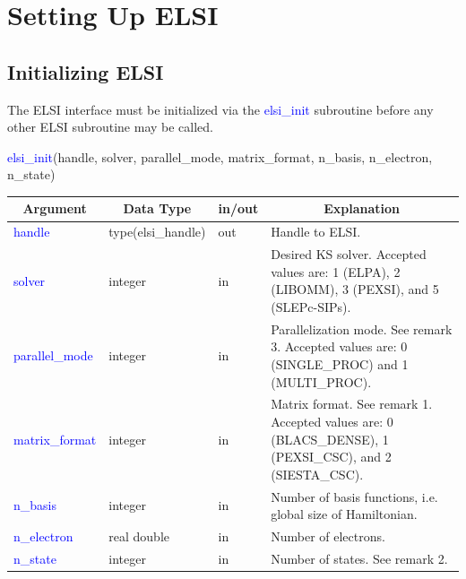 \documentclass{report}
\begin{document}
\section{Setting Up ELSI}
\label{sec:setup}
\subsection{Initializing ELSI}
\label{subsec:setup_init}
The ELSI interface must be initialized via the \textcolor{blue}{elsi\_init} subroutine before any other ELSI subroutine may be called.\\

\begin{labeling}{\hspace{6cm}}
\item [\hspace{0.3cm} \textcolor{blue}{elsi\_init}(handle, solver, parallel\_mode, matrix\_format, n\_basis, n\_electron, n\_state)]
\end{labeling}

\begin{tabular}[]{|p{30mm}|p{30mm}|p{15mm}|p{90mm}|}
\hline
\multicolumn{1}{|c|}{\textbf{Argument}} & \multicolumn{1}{c|}{\textbf{Data Type}} & \multicolumn{1}{c|}{\textbf{in/out}} & \multicolumn{1}{c|}{\textbf{Explanation}}\\
\hline
\textcolor{blue}{handle}         & type(elsi\_handle) & out & Handle to ELSI.\\
\hline
\textcolor{blue}{solver}         & integer            & in  & Desired KS solver.  Accepted values are:  1 (ELPA), 2 (LIBOMM), 3 (PEXSI), and 5 (SLEPc-SIPs).\\
\hline
\textcolor{blue}{parallel\_mode} & integer            & in  & Parallelization mode.  See remark 3.  Accepted values are:  0 (SINGLE\_PROC) and 1 (MULTI\_PROC).\\
\hline
\textcolor{blue}{matrix\_format} & integer            & in  & Matrix format.  See remark 1.  Accepted values are:  0 (BLACS\_DENSE), 1 (PEXSI\_CSC), and 2 (SIESTA\_CSC).\\
\hline
\textcolor{blue}{n\_basis}       & integer            & in  & Number of basis functions, i.e. global size of Hamiltonian.\\
\hline
\textcolor{blue}{n\_electron}    & real double        & in  & Number of electrons.\\
\hline
\textcolor{blue}{n\_state}       & integer            & in  & Number of states.  See remark 2.\\
\hline
\end{tabular}
\end{document}
